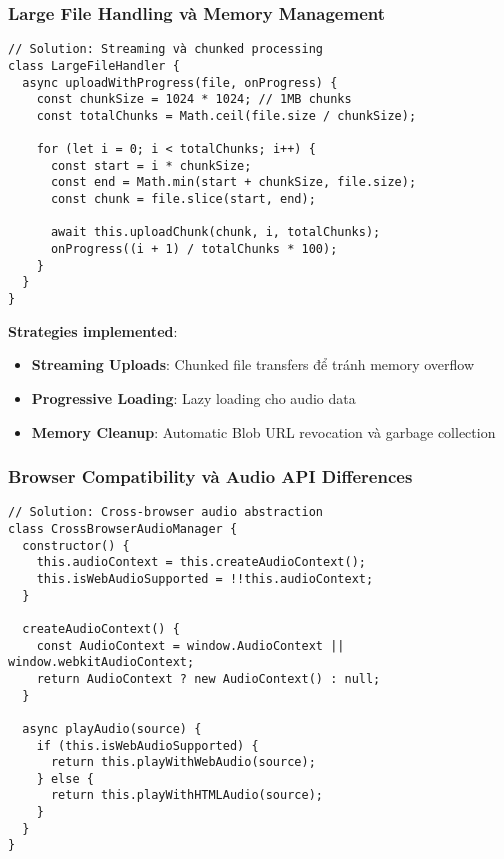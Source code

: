 \documentclass[12pt,a4paper]{article}
\begin{document}
\subsubsection{Large File Handling và Memory Management}

\begin{lstlisting}[caption={Streaming và chunked processing}]
// Solution: Streaming và chunked processing
class LargeFileHandler {
  async uploadWithProgress(file, onProgress) {
    const chunkSize = 1024 * 1024; // 1MB chunks
    const totalChunks = Math.ceil(file.size / chunkSize);
    
    for (let i = 0; i < totalChunks; i++) {
      const start = i * chunkSize;
      const end = Math.min(start + chunkSize, file.size);
      const chunk = file.slice(start, end);
      
      await this.uploadChunk(chunk, i, totalChunks);
      onProgress((i + 1) / totalChunks * 100);
    }
  }
}
\end{lstlisting}

\textbf{Strategies implemented}:
\begin{itemize}
\item \textbf{Streaming Uploads}: Chunked file transfers để tránh memory overflow
\item \textbf{Progressive Loading}: Lazy loading cho audio data
\item \textbf{Memory Cleanup}: Automatic Blob URL revocation và garbage collection
\end{itemize}

\subsubsection{Browser Compatibility và Audio API Differences}

\begin{lstlisting}[caption={Cross-browser audio abstraction}]
// Solution: Cross-browser audio abstraction
class CrossBrowserAudioManager {
  constructor() {
    this.audioContext = this.createAudioContext();
    this.isWebAudioSupported = !!this.audioContext;
  }
  
  createAudioContext() {
    const AudioContext = window.AudioContext || window.webkitAudioContext;
    return AudioContext ? new AudioContext() : null;
  }
  
  async playAudio(source) {
    if (this.isWebAudioSupported) {
      return this.playWithWebAudio(source);
    } else {
      return this.playWithHTMLAudio(source);
    }
  }
}
\end{lstlisting}
\end{document}
